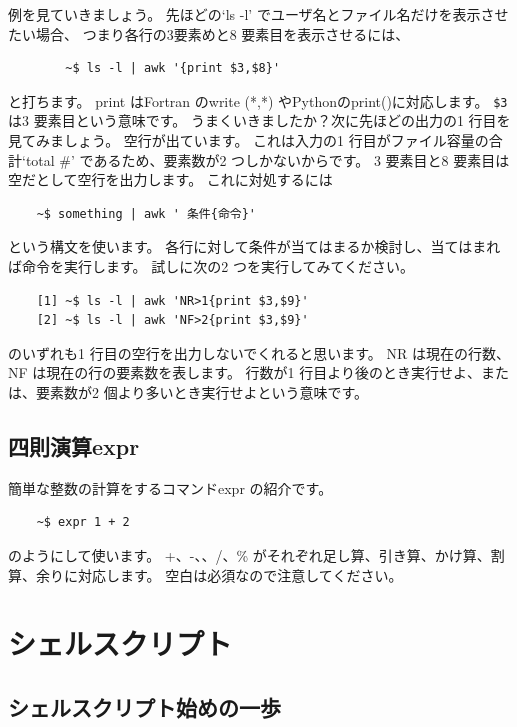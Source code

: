 \documentclass[a4j]{ltjreport}
\begin{document}
    例を見ていきましょう。
    先ほどの`ls -l' でユーザ名とファイル名だけを表示させたい場合、
    つまり各行の3要素めと8 要素目を表示させるには、
    \begin{verbatim}
        ~$ ls -l | awk '{print $3,$8}'
    \end{verbatim}
    と打ちます。
    print はFortran のwrite (*,*) やPythonのprint()に対応します。
    \verb+$3+ は3 要素目という意味です。
    うまくいきましたか？次に先ほどの出力の1 行目を見てみましょう。
    空行が出ています。
    これは入力の1 行目がファイル容量の合計`total \#' であるため、要素数が2 つしかないからです。
    3 要素目と8 要素目は空だとして空行を出力します。
    これに対処するには
    \begin{verbatim}
    ~$ something | awk ' 条件{命令}'
    \end{verbatim}
    という構文を使います。
    各行に対して条件が当てはまるか検討し、当てはまれば命令を実行します。
    試しに次の2 つを実行してみてください。
    \begin{verbatim}
    [1] ~$ ls -l | awk 'NR>1{print $3,$9}'
    [2] ~$ ls -l | awk 'NF>2{print $3,$9}'
    \end{verbatim}
    のいずれも1 行目の空行を出力しないでくれると思います。
    NR は現在の行数、NF は現在の行の要素数を表します。
    行数が1 行目より後のとき実行せよ、または、要素数が2 個より多いとき実行せよという意味です。

    \section{四則演算expr}
    簡単な整数の計算をするコマンドexpr の紹介です。
    \begin{verbatim}
    ~$ expr 1 + 2
    \end{verbatim}
    のようにして使います。
    +、-、\*、/、\% がそれぞれ足し算、引き算、かけ算、割算、余りに対応します。
    空白は必須なので注意してください。





    \chapter{シェルスクリプト}
    \section{シェルスクリプト始めの一歩}
\end{document}
